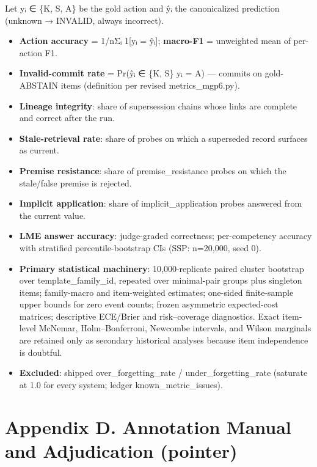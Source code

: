 Let yᵢ ∈ \{K, S, A\} be the gold action and ŷᵢ the canonicalized
prediction (unknown → INVALID, always incorrect).

\begin{itemize}
\item
  \textbf{Action accuracy} = 1/nΣᵢ 1{[}yᵢ = ŷᵢ{]}; \textbf{macro-F1} =
  unweighted mean of per-action F1.
\item
  \textbf{Invalid-commit rate} = Pr(ŷᵢ ∈ \{K, S\} \textbar{} yᵢ = A) ---
  commits on gold-ABSTAIN items (definition per revised
  metrics\_mgp6.py).
\item
  \textbf{Lineage integrity}: share of supersession chains whose links
  are complete and correct after the run.
\item
  \textbf{Stale-retrieval rate}: share of probes on which a superseded
  record surfaces as current.
\item
  \textbf{Premise resistance}: share of premise\_resistance probes on
  which the stale/false premise is rejected.
\item
  \textbf{Implicit application}: share of implicit\_application probes
  answered from the current value.
\item
  \textbf{LME answer accuracy}: judge-graded correctness; per-competency
  accuracy with stratified percentile-bootstrap CIs (SSP: n=20,000, seed
  0).
\item
  \textbf{Primary statistical machinery}: 10,000-replicate paired
  cluster bootstrap over template\_family\_id, repeated over
  minimal-pair groups plus singleton items; family-macro and
  item-weighted estimates; one-sided finite-sample upper bounds for zero
  event counts; frozen asymmetric expected-cost matrices; descriptive
  ECE/Brier and risk--coverage diagnostics. Exact item-level McNemar,
  Holm--Bonferroni, Newcombe intervals, and Wilson marginals are
  retained only as secondary historical analyses because item
  independence is doubtful.
\item
  \textbf{Excluded}: shipped over\_forgetting\_rate /
  under\_forgetting\_rate (saturate at 1.0 for every system; ledger
  known\_metric\_issues).
\end{itemize}

\section{Appendix D. Annotation Manual and Adjudication
(pointer)}\label{appendix-d.-annotation-manual-and-adjudication-pointer}


